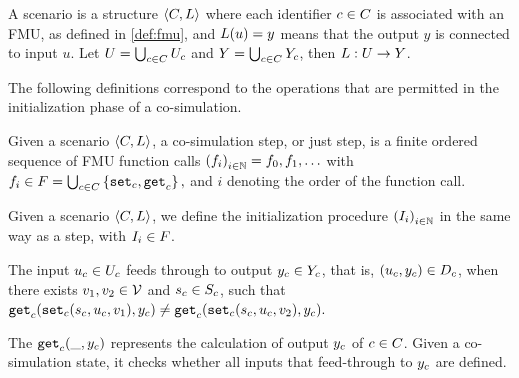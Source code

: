\documentclass[runningheads]{llncs}
\begin{document}
\begin{definition}[Scenario]\label{def:cosim_scenario}
  A scenario is a structure $ \left\langle C, L \right\rangle $ where each identifier $c \in C$ is associated with an FMU, as defined in \ref{def:fmu}, and $L(u)=y$ means that the output $y$ is connected to input $u$.
  Let $U = \bigcup_{c \in C} U_{c}$ and $Y = \bigcup_{c \in C} Y_{c}$, then $L : U \to Y$.
\end{definition}

The following definitions correspond to the operations that are permitted in the initialization phase of a co-simulation.

\begin{definition}[Step]\label{def:cosim_step}
  Given a scenario $ \left\langle C, L \right\rangle $, a co-simulation step, or just step, is a finite ordered sequence of FMU function calls $ \left( f_i \right)_{i \in \mathbb{N}} = f_0, f_1, \ldots$ with
  $f_i \in F = \bigcup_{c \in C}  \left\{ \mathtt{set}_{c},\mathtt{get}_{c} \right\},$
  and $i$ denoting the order of the function call.
\end{definition}

\begin{definition}[Initialization]\label{def:initialization}
  Given a scenario $ \left\langle C, L \right\rangle $, we define the initialization procedure $ \left( I_i \right)_{i \in \mathbb{N}}$ in the same way as a step, with $I_i \in F$.
\end{definition}

\begin{definition}\label{def:feedthrough}
  The input $u_{c} \in U_{c}$ feeds through to output $y_{c} \in Y_{c}$, that is, $(u_{c},y_{c}) \in D_{c}$, when there exists $v_1, v_2 \in \mathcal{V}$ and $s_{c} \in S_{c}$, such that
  $
  \mathtt{get}_{c} (\mathtt{set}_{c}(s_{c}, u_{c}, v_1), y_{c}) \neq \mathtt{get}_{c} (\mathtt{set}_{c}(s_{c}, u_{c}, v_2), y_{c}).
  $
\end{definition}

\begin{definition}\label{def:getout}
The $\mathtt{get}_{c}(\_, y_{c})$ represents the calculation of output $y_{c}$ of $c \in C$. Given a co-simulation state, it checks whether all inputs that feed-through to $y_{c}$ are defined.
\end{definition}
\end{document}
